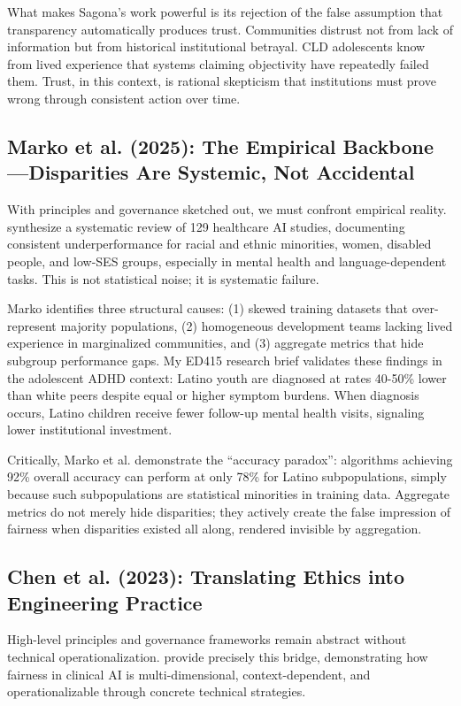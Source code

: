 \documentclass[12pt,a4paper]{article}
\begin{document}
What makes Sagona's work powerful is its rejection of the false assumption that transparency automatically produces trust. Communities distrust not from lack of information but from historical institutional betrayal. CLD adolescents know from lived experience that systems claiming objectivity have repeatedly failed them. Trust, in this context, is rational skepticism that institutions must prove wrong through consistent action over time.

\subsection{Marko et al. (2025): The Empirical Backbone---Disparities Are Systemic, Not Accidental}

With principles and governance sketched out, we must confront empirical reality. \citet{Marko2025} synthesize a systematic review of 129 healthcare AI studies, documenting consistent underperformance for racial and ethnic minorities, women, disabled people, and low-SES groups, especially in mental health and language-dependent tasks. This is not statistical noise; it is systematic failure.

Marko identifies three structural causes: (1) skewed training datasets that over-represent majority populations, (2) homogeneous development teams lacking lived experience in marginalized communities, and (3) aggregate metrics that hide subgroup performance gaps. My ED415 research brief validates these findings in the adolescent ADHD context: Latino youth are diagnosed at rates 40-50\% lower than white peers despite equal or higher symptom burdens. When diagnosis occurs, Latino children receive fewer follow-up mental health visits, signaling lower institutional investment.

Critically, Marko et al. demonstrate the ``accuracy paradox'': algorithms achieving 92\% overall accuracy can perform at only 78\% for Latino subpopulations, simply because such subpopulations are statistical minorities in training data. Aggregate metrics do not merely hide disparities; they actively create the false impression of fairness when disparities existed all along, rendered invisible by aggregation.

\subsection{Chen et al. (2023): Translating Ethics into Engineering Practice}

High-level principles and governance frameworks remain abstract without technical operationalization. \citet{Chen2023} provide precisely this bridge, demonstrating how fairness in clinical AI is multi-dimensional, context-dependent, and operationalizable through concrete technical strategies.
\end{document}
